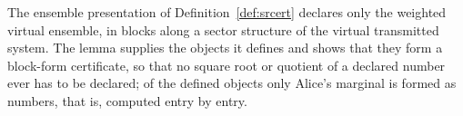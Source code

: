 
The ensemble presentation of Definition~\ref{def:srcert} declares only the
weighted virtual ensemble, in blocks along a sector structure of the virtual
transmitted system. The lemma supplies the objects it defines and shows that
they form a block-form certificate, so that no square root or quotient of a
declared number ever has to be declared; of the defined objects only Alice's
marginal is formed as numbers, that is, computed entry by entry.

